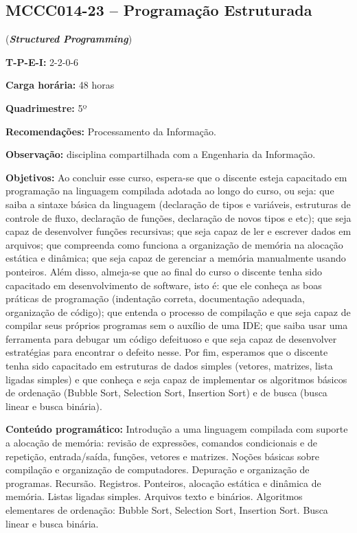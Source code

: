 \documentclass[class=article, crop=false]{standalone}
\begin{document}
\subsection*{MCCC014-23 -- Programação Estruturada}
\label{disc:pe}

(\textbf{\textit{Structured Programming}})

\begin{center}
    \begin{minipage}{0.85\textwidth}
        \textbf{T-P-E-I:} 2-2-0-6
        
        \textbf{Carga horária:} 48 horas
        
        \textbf{Quadrimestre:} 5º
        
        \textbf{Recomendações:} 
        Processamento da Informação.
        
        \textbf{Observação:} disciplina compartilhada com a Engenharia da Informação.
    \end{minipage}
\end{center}

\textbf{Objetivos:}
Ao concluir esse curso, espera-se que o discente esteja capacitado em
programação na linguagem compilada adotada ao longo do curso, ou seja: que
saiba a sintaxe básica da linguagem (declaração de tipos e variáveis,
estruturas de controle de fluxo, declaração de funções, declaração de novos
tipos e etc); que seja capaz de desenvolver funções recursivas; que seja capaz
de ler e escrever dados em arquivos; que compreenda como funciona a organização
de memória na alocação estática e dinâmica; que seja capaz de gerenciar a
memória manualmente usando ponteiros. 
Além disso, almeja-se que ao final do curso o discente tenha sido capacitado em
desenvolvimento de software, isto é: que ele conheça as boas práticas de
programação (indentação correta, documentação adequada, organização de código);
que entenda o processo de compilação e que seja capaz de compilar seus próprios
programas sem o auxílio de uma IDE; que saiba usar uma ferramenta para debugar
um código defeituoso e que seja capaz de desenvolver estratégias para encontrar
o defeito nesse.
Por fim, esperamos que o discente tenha sido capacitado em estruturas de dados
simples (vetores, matrizes, lista ligadas simples) e que conheça e seja capaz
de implementar os algoritmos básicos de ordenação (Bubble Sort, Selection Sort,
Insertion Sort) e de busca (busca linear e busca binária).

\textbf{Conteúdo programático:}
Introdução a uma linguagem compilada com suporte a alocação de memória: revisão 
de expressões, comandos condicionais e de repetição, entrada/saída, funções, 
vetores e matrizes.
Noções básicas sobre compilação e organização de computadores.
Depuração e organização de programas.
Recursão.
Registros.
Ponteiros, alocação estática e dinâmica de memória.
Listas ligadas simples.
Arquivos texto e binários.
Algoritmos elementares de ordenação: Bubble Sort, Selection Sort, Insertion Sort.
Busca linear e busca binária.
\end{document}
